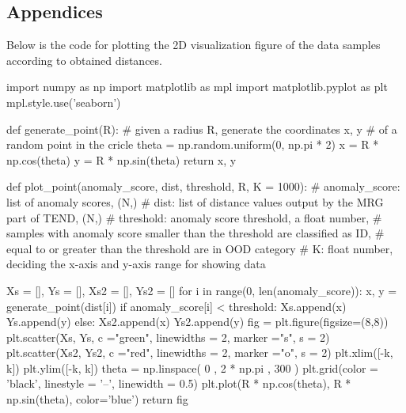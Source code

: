 \documentclass[12pt]{spieman}  %
\begin{document}
\begin{spacing}{2}


\clearpage
\section{Appendices}
Below is the code for plotting the 2D visualization figure of the data samples according to obtained distances.

\begin{python}
import numpy as np
import matplotlib as mpl
import matplotlib.pyplot as plt
mpl.style.use('seaborn')

def generate_point(R):
    # given a radius R, generate the coordinates x, y 
    # of a random point in the cricle 
    theta = np.random.uniform(0, np.pi * 2)
    x = R * np.cos(theta)
    y = R * np.sin(theta)
    return x, y

def plot_point(anomaly_score, dist, threshold, R, K = 1000):    
    # anomaly_score: list of anomaly scores, (N,)
    # dist: list of distance values output by the MRG part of TEND, (N,)
    # threshold: anomaly score threshold, a float number, 
    # samples with anomaly score smaller than the threshold are classified as ID, 
    # equal to or greater than the threshold are in OOD category
    # K: float number, deciding the x-axis and y-axis range for showing data
    
    Xs = [], Ys = [], Xs2 = [], Ys2 = []
    for i in range(0, len(anomaly_score)):
        x, y = generate_point(dist[i])
        if anomaly_score[i] < threshold:
            Xs.append(x)
            Ys.append(y)
        else:
            Xs2.append(x)
            Ys2.append(y)
    fig = plt.figure(figsize=(8,8))
    plt.scatter(Xs, Ys, c ="green", linewidths = 2, marker ="s", s = 2)
    plt.scatter(Xs2, Ys2, c ="red", linewidths = 2, marker ="o", s = 2)
    plt.xlim([-k, k])
    plt.ylim([-k, k])
    theta = np.linspace( 0 , 2 * np.pi , 300 ) 
    plt.grid(color = 'black', linestyle = '--', linewidth = 0.5)  
    plt.plot(R * np.cos(theta), R * np.sin(theta), color='blue')
    return fig
\end{python}


\end{spacing}
\end{document}
